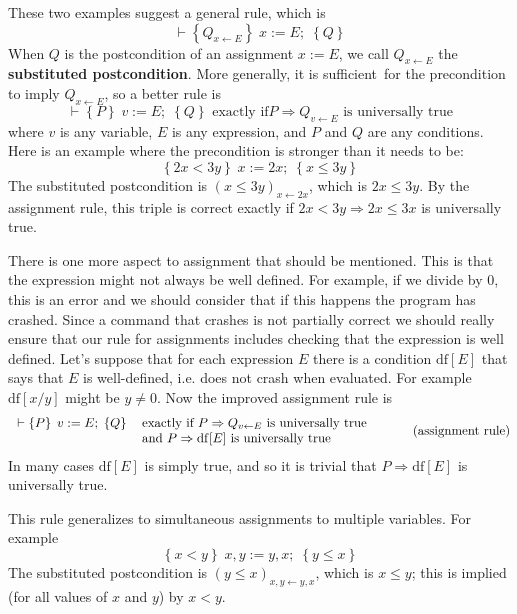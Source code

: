\documentclass[11pt]{article}%
\begin{document}
These two examples suggest a general rule, which is%
\[
\vdash\left\{  Q_{x\leftarrow E}\right\}  \;x:=E;\;\left\{  Q\right\}
\]
When $Q$ is the postcondition of an assignment $x:=E$, we call $Q_{x\leftarrow
E}$ the \textbf{substituted postcondition}. More generally, it is
sufficient\ for the precondition to imply $Q_{x\leftarrow E}$, so a better
rule is%
\begin{equation}
\vdash\left\{  P\right\}  \;v:=E;\;\left\{  Q\right\}  \text{ exactly if
}P\Rightarrow Q_{v\leftarrow E}\text{ is universally true}\nonumber
\end{equation}
where $v$ is any variable, $E$ is any expression, and $P$ and $Q$ are any
conditions. Here is an example where the precondition is stronger than it
needs to be:%
\[
\left\{  2x<3y\right\}  \;x:=2x;\;\left\{  x\leq3y\right\}
\]
The substituted postcondition is $(x\leq3y)_{x\leftarrow2x}$, which is
$2x\leq3y$. By the assignment rule, this triple is correct exactly if
$2x<3y\Rightarrow2x\leq3x$ is universally true.

There is one more aspect to assignment that should be mentioned. This is that
the expression might not always be well defined. For example, if we divide by
$0$, this is an error and we should consider that if this happens the program
has crashed. Since a command that crashes is not partially correct we should
really ensure that our rule for assignments includes checking that the
expression is well defined. Let's suppose that for each expression $E$ there
is a condition $\mathrm{df}[E]$ that says that $E$ is well-defined, i.e. does
not crash when evaluated. For example $\mathrm{df}[x/y]$ might be $y\neq0$.
Now the improved assignment rule is
\begin{equation}%
\begin{tabular}
[c]{ll}%
$\vdash\left\{  P\right\}  \;v:=E;\;\left\{  Q\right\}  $ & $\text{exactly if
}P\Rightarrow Q_{v\leftarrow E}\text{ is universally true}$\\
& $\text{and }P\Rightarrow\mathrm{df}[E]\text{ is universally true}$%
\end{tabular}
\ \ \text{ }\tag{assignment rule}%
\end{equation}
In many cases $\mathrm{df}[E]$ is simply $\mathrm{true}$, and so it is trivial
that $P\Rightarrow\mathrm{df}[E]$ is universally true.

This rule generalizes to simultaneous assignments to multiple variables. For
example%
\[
\left\{  x<y\right\}  \;x,y:=y,x;\;\left\{  y\leq x\right\}
\]
The substituted postcondition is $\left(  y\leq x\right)  _{x,y\leftarrow
y,x}$, which is $x\leq y$; this is implied (for all values of $x$ and $y$) by
$x<y$.
\end{document}
